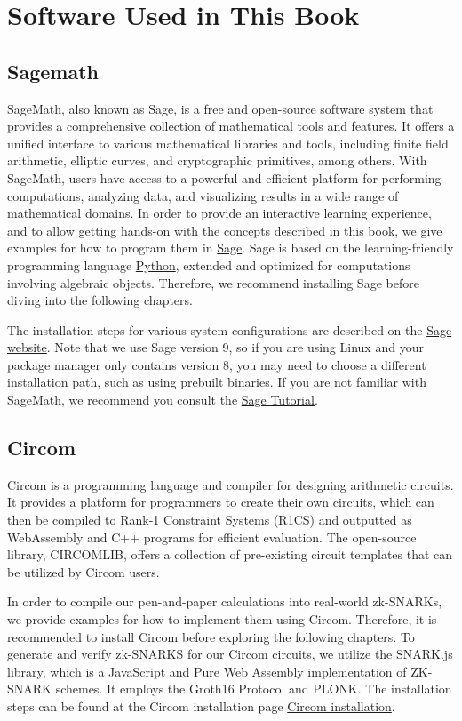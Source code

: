 \chapter{Software Used in This Book}

\section{Sagemath}
\label{sagemath_setup}
SageMath, also known as Sage, is a free and open-source software system that provides a comprehensive collection of mathematical tools and features. It offers a unified interface to various mathematical libraries and tools, including finite field arithmetic, elliptic curves, and cryptographic primitives, among others. With SageMath, users have access to a powerful and efficient platform for performing computations, analyzing data, and visualizing results in a wide range of mathematical domains. In order to provide an interactive learning experience, and to allow getting hands-on with the concepts described in this book, we give examples for how to program them in \href{https://www.sagemath.org/}{Sage}. Sage is based on the learning-friendly programming language \href{https://www.python.org/}{Python},  extended and optimized for computations involving algebraic objects. Therefore, we recommend installing Sage before diving into the following chapters.

The installation steps for various system configurations are described on the \href{https://doc.sagemath.org/html/en/installation/index.html}{Sage website}. Note that we use Sage version 9, so if you are using Linux and your package manager only contains version 8, you may need to choose a different installation path, such as using prebuilt binaries. If you are not familiar with SageMath, we recommend you consult the \href{https://doc.sagemath.org/html/en/tutorial/index.html}{Sage Tutorial}.

\section{Circom}
\label{circom_setup}
Circom is a programming language and compiler for designing arithmetic circuits. It provides a platform for programmers to create their own circuits, which can then be compiled to Rank-1 Constraint Systems (R1CS) and outputted as WebAssembly and C++ programs for efficient evaluation. The open-source library, CIRCOMLIB, offers a collection of pre-existing circuit templates that can be utilized by Circom users.

In order to compile our pen-and-paper calculations into real-world zk-SNARKs, we provide examples for how to implement them using Circom. Therefore, it is recommended to install Circom before exploring the following chapters. To generate and verify zk-SNARKS for our Circom circuits, we utilize the SNARK.js library, which is a JavaScript and Pure Web Assembly implementation of ZK-SNARK schemes. It employs the Groth16 Protocol and PLONK. The installation steps can be found at the Circom installation page \href{https://docs.circom.io/getting-started/installation/#installing-circom}{Circom installation}.

